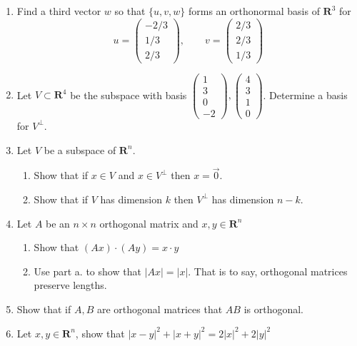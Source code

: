 \documentclass[12pt]{article}
\numberwithin{equation}{subsection}
\numberwithin{figure}{subsection}
\theoremstyle{note}
\newcommand{\R}{\mathbf{R}}
\newcommand\m[1]{\begin{pmatrix}#1\end{pmatrix}}
\begin{document}
\begin{enumerate}[label=\arabic*.]
\begin{enumerate}
\end{enumerate}



\item Find a third vector $w$ so that $\{u,v,w\}$ forms an orthonormal basis of $\R^3$ for \[u=\begin{pmatrix} -2/3 \\ 1/3\\2/3\end{pmatrix}, \qquad v=\m{ 2/3 \\ 2/3\\ 1/3}\]
\item Let $V\subset \R^4$ be the subspace with basis $\begin{pmatrix} 1 \\ 3 \\ 0 \\ -2\end{pmatrix}, \begin{pmatrix} 4 \\ 3\\ 1 \\ 0\end{pmatrix}$. Determine a basis for $V^{\perp}$.

\item Let $V$ be a subspace of $\R^n$. 
	\begin{enumerate}
		\item Show that if $x\in V$ and $x\in V^{\perp}$ then $x=\vec{0}$. 
		\item Show that if $V$ has dimension $k$ then $V^{\perp}$ has dimension $n-k$.
	\end{enumerate}
\item Let $A$ be an $n\times n$ orthogonal matrix and $x,y\in \R^n$
\begin{enumerate}
	\item Show that $(Ax)\cdot (Ay)=x\cdot y$
	\item Use part a. to show that $|Ax|=|x|$. That is to say, orthogonal matrices preserve lengths. 

\end{enumerate}

\item Show that if $A,B$ are orthogonal matrices that $AB$ is orthogonal. 

\item Let $x,y\in \R^n$, show that $|x-y|^2+|x+y|^2=2|x|^2+2|y|^2$




\end{enumerate}
\end{document}
